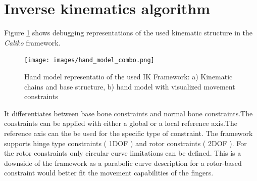 \section{Inverse kinematics algorithm}
Figure \ref{img:hand-constraint_debug_view} shows debugging representations of the used kinematic structure in the \textit{Caliko} framework.
\begin{figure}[H]
\centering
\texttt{[image: images/hand\_model\_combo.png]}
\caption{Hand model representatio of the used IK Framework: a) Kinematic chains and base structure, b) hand model with visualized movement constraints}
\label{img:hand-constraint_debug_view} 
\end{figure} 
It differentiates between base bone constraints and normal bone constraints.The constraints can be applied with either a global or a local reference axis.The reference axis can the be used for the specific type of constraint. The framework supports hinge type constraints ( 1DOF ) and rotor constraints ( 2DOF ). For the rotor constraints only circular curve limitations can be defined. This is a downside of the framework as a parabolic curve description for a rotor-based constraint would better fit the movement capabilities of the fingers.